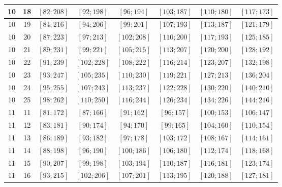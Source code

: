 \documentclass[a4paper,12pt]{article}
\begin{document}
\begin{center}
{\begin{longtable}[H]{|c|c|c|c|c|c|c|c|}
10 &  18 &  $\left[ 82; 208\right]$ &  $\left[ 92; 198\right]$ &  $\left[ 96; 194\right]$ &  $\left[ 103; 187\right]$ &  $\left[ 110; 180\right]$ &  $\left[ 117; 173\right]$ \tabularnewline \hline
10 &  19 &  $\left[ 84; 216\right]$ &  $\left[ 94; 206\right]$ &  $\left[ 99; 201\right]$ &  $\left[ 107; 193\right]$ &  $\left[ 113; 187\right]$ &  $\left[ 121; 179\right]$ \tabularnewline \hline
10 &  20 &  $\left[ 87; 223\right]$ &  $\left[ 97; 213\right]$ &  $\left[ 102; 208\right]$ &  $\left[ 110; 200\right]$ &  $\left[ 117; 193\right]$ &  $\left[ 125; 185\right]$ \tabularnewline \hline
10 &  21 &  $\left[ 89; 231\right]$ &  $\left[ 99; 221\right]$ &  $\left[ 105; 215\right]$ &  $\left[ 113; 207\right]$ &  $\left[ 120; 200\right]$ &  $\left[ 128; 192\right]$ \tabularnewline \hline
10 &  22 &  $\left[ 91; 239\right]$ &  $\left[ 102; 228\right]$ &  $\left[ 108; 222\right]$ &  $\left[ 116; 214\right]$ &  $\left[ 123; 207\right]$ &  $\left[ 132; 198\right]$ \tabularnewline \hline
10 &  23 &  $\left[ 93; 247\right]$ &  $\left[ 105; 235\right]$ &  $\left[ 110; 230\right]$ &  $\left[ 119; 221\right]$ &  $\left[ 127; 213\right]$ &  $\left[ 136; 204\right]$ \tabularnewline \hline
10 &  24 &  $\left[ 95; 255\right]$ &  $\left[ 107; 243\right]$ &  $\left[ 113; 237\right]$ &  $\left[ 122; 228\right]$ &  $\left[ 130; 220\right]$ &  $\left[ 140; 210\right]$ \tabularnewline \hline
10 &  25 &  $\left[ 98; 262\right]$ &  $\left[ 110; 250\right]$ &  $\left[ 116; 244\right]$ &  $\left[ 126; 234\right]$ &  $\left[ 134; 226\right]$ &  $\left[ 144; 216\right]$ \tabularnewline \hline
11 &  11 &  $\left[ 81; 172\right]$ &  $\left[ 87; 166\right]$ &  $\left[ 91; 162\right]$ &  $\left[ 96; 157\right]$ &  $\left[ 100; 153\right]$ &  $\left[ 106; 147\right]$ \tabularnewline \hline
11 &  12 &  $\left[ 83; 181\right]$ &  $\left[ 90; 174\right]$ &  $\left[ 94; 170\right]$ &  $\left[ 99; 165\right]$ &  $\left[ 104; 160\right]$ &  $\left[ 110; 154\right]$ \tabularnewline \hline
11 &  13 &  $\left[ 86; 189\right]$ &  $\left[ 93; 182\right]$ &  $\left[ 97; 178\right]$ &  $\left[ 103; 172\right]$ &  $\left[ 108; 167\right]$ &  $\left[ 114; 161\right]$ \tabularnewline \hline
11 &  14 &  $\left[ 88; 198\right]$ &  $\left[ 96; 190\right]$ &  $\left[ 100; 186\right]$ &  $\left[ 106; 180\right]$ &  $\left[ 112; 174\right]$ &  $\left[ 118; 168\right]$ \tabularnewline \hline
11 &  15 &  $\left[ 90; 207\right]$ &  $\left[ 99; 198\right]$ &  $\left[ 103; 194\right]$ &  $\left[ 110; 187\right]$ &  $\left[ 116; 181\right]$ &  $\left[ 123; 174\right]$ \tabularnewline \hline
11 &  16 &  $\left[ 93; 215\right]$ &  $\left[ 102; 206\right]$ &  $\left[ 107; 201\right]$ &  $\left[ 113; 195\right]$ &  $\left[ 120; 188\right]$ &  $\left[ 127; 181\right]$ \tabularnewline \hline

\end{longtable}}
\end{center}
\end{document}
